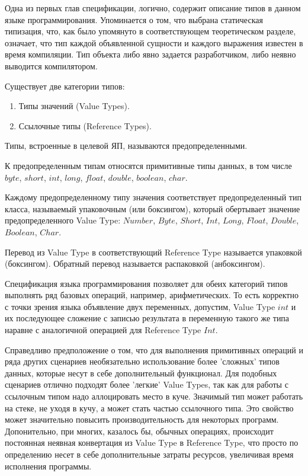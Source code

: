 \documentclass{mipt-thesis-bs}
\begin{document}
Одна из первых глав спецификации, логично, содержит описание типов в данном языке 
программирования. Упоминается о том, что выбрана статическая типизация, что, как 
было упомянуто в соответствующем теоретическом разделе, означает, что тип 
каждой объявленной сущности и каждого выражения известен в
время компиляции. Тип объекта либо явно задается разработчиком, 
либо неявно выводится компилятором.

Существует две категории типов:
\begin{enumerate}
    \item Типы значений (Value Types).
    \item Ссылочные типы (Reference Types).
\end{enumerate}

Типы, встроенные в целевой ЯП, называются предопределенными.

К предопределенным типам относятся примитивные типы данных, в том числе 
$byte$, $short$, $int$, $long$, $float$, $double$, $boolean$, $char$.

Каждому предопределенному типу значения соответствует 
предопределенный тип класса, называемый 
упаковочным (или боксингом), который обертывает значение предопределенного 
Value Type: $Number$, $Byte$, $Short$, $Int$, $Long$, $Float$, $Double$, $Boolean$, $Char$.

Перевод из Value Type в соответствующий Reference Type называется упаковкой
(боксингом). Обратный перевод называется распаковкой (анбоксингом).

Спецификация языка программирования позволяет для обеих категорий типов выполнять ряд
базовых операций, например, арифметических. То есть корректно с точки зрения языка
объявление двух переменных, допустим, Value Type $int$ и их последующее сложение с записью
результата в переменную такого же типа наравне с аналогичной операцией для Reference Type $Int$.

Справедливо предположение о том, что для выполнения примитивных операций и ряда других
сценариев необязательно использование более 'сложных' типов данных, которые несут 
в себе дополнительный функционал.
Для подобных сценариев отлично подходят более 'легкие' Value Types, так как для работы 
с ссылочным типом надо аллоцировать место в куче. Значимый тип может работать на 
стеке, не уходя в кучу, а может стать частью ссылочного типа. 
Это свойство может значительно повысить производительность для некоторых программ.
Допонительно, при многих, казалось бы, обычных операциях, происходит постоянная неявная
конвертация из Value Type в Reference Type, что просто по определению несет в себе 
дополнительные затраты ресурсов, увеличивая время исполнения программы.
\end{document}
